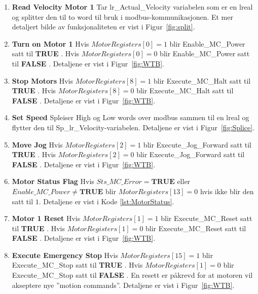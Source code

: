 \documentclass{ol-softwaremanual}
\newcommand{\figref}[1]{Figur~\ref{#1}}
\newcommand{\true}{\textbf{TRUE} }
\newcommand{\false}{\textbf{FALSE} }
\begin{document}
\begin{enumerate}[label= \textbf{Network \arabic*:}]
    \item \textbf{Read Velocity Motor 1} Tar lr\_Actual\_Velocity variabelen som er en \Gls{lreal} og splitter den til to \gls{word} til bruk i \gls{modbus}-kommunikasjonen. Et mer detaljert bilde av funksjonaliteten er vist i \figref{fig:split}.
    \item \textbf{Turn on Motor 1} Hvis $MotorRegisters[0] = 1$ blir Enable\_MC\_Power satt  til \true. Hvis $MotorRegisters[0] = 0$ blir Enable\_MC\_Power satt  til \false. Detaljene er vist i \figref{fig:WTB}.
    \item \textbf{Stop Motors} Hvis $MotorRegisters[8] = 1$ blir Execute\_MC\_Halt satt  til \true. Hvis $MotorRegisters[8] = 0$ blir Execute\_MC\_Halt satt til \false. Detaljene er vist i \figref{fig:WTB}.
    \item \textbf{Set Speed} Spleiser High og Low \glspl{word}  over \gls{modbus} sammen til en \Gls{lreal} og flytter den til Sp\_lr\_Velocity-variabelen. Detaljene er vist i \figref{fig:Splice}.
    \item \textbf{Move Jog} Hvis $MotorRegisters[2] = 1$ blir Execute\_Jog\_Forward satt  til \true. Hvis $MotorRegisters[2] = 0$ blir Execute\_Jog\_Forward satt til \false. Detaljene er vist i \figref{fig:WTB}.
    \item \textbf{Motor Status Flag} Hvis $Sts\_MC\_Error = \true $ eller $Enable\_MC\_Power \neq \true$ blir $MotorRegisters[13]=0$ hvis ikke blir den satt til $1$. Detaljene er vist i Kode \ref{lst:MotorStatus}.
    \item \textbf{Motor 1 Reset} Hvis $MotorRegisters[1] = 1$ blir Execute\_MC\_Reset satt til \true. Hvis $MotorRegisters[1] = 0$ blir Execute\_MC\_Reset satt til \false. Detaljene er vist i \figref{fig:WTB}.
    \item \textbf{Execute Emergency Stop} Hvis $MotorRegisters[15] = 1$ blir Execute\_MC\_Stop satt til \true. Hvis $MotorRegisters[1] = 0$ blir Execute\_MC\_Stop satt til \false. En resett er påkrevd for at motoren vil akseptere nye ''motion commands''. Detaljene er vist i \figref{fig:WTB}.
\end{enumerate}
\clearpage
\appendix
\end{document}
